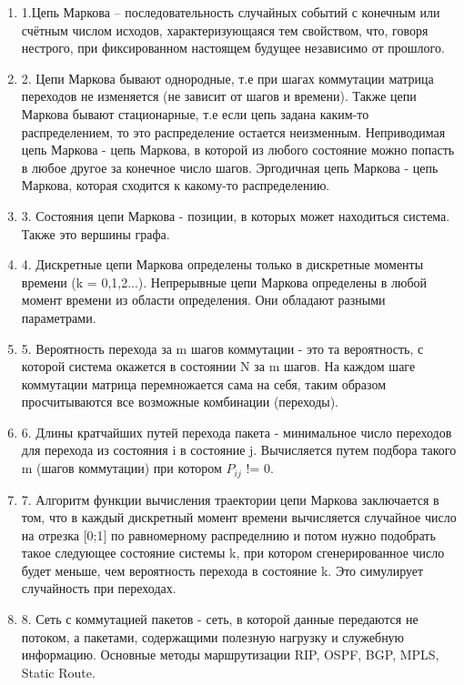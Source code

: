 \begin{enumerate}
    \item 1.Цепь Маркова – последовательность случайных событий с конечным или счётным числом исходов, характеризующаяся тем 
    свойством, что, говоря нестрого, при фиксированном настоящем будущее независимо от прошлого.
    \item 2. Цепи Маркова бывают однородные, т.е при шагах коммутации матрица переходов не изменяется (не зависит от шагов и времени).
    Также цепи Маркова бывают стационарные, т.е если цепь задана каким-то распределением, то это распределение остается неизменным.
    Неприводимая цепь Маркова - цепь Маркова, в которой из любого состояние можно попасть в любое другое за конечное число шагов.
    Эргодичная цепь Маркова - цепь Маркова, которая сходится к какому-то распределению.
    \item 3. Состояния цепи Маркова - позиции, в которых может находиться система. Также это вершины графа.
    \item 4. Дискретные цепи Маркова определены только в дискретные моменты времени (k = 0,1,2...). Непрерывные цепи Маркова
    определены в любой момент времени из области определения. Они обладают разными параметрами.
    \item 5. Вероятность перехода за m шагов коммутации - это та вероятность, с которой система окажется в состоянии N за m шагов.
    На каждом шаге коммутации матрица перемножается сама на себя, таким образом просчитываются все возможные комбинации (переходы).
    \item 6. Длины кратчайших путей перехода пакета - минимальное число переходов для перехода из состояния i в состояние j.
    Вычисляется путем подбора такого m (шагов коммутации) при котором  $P_{ij}$ != 0.
    \item 7. Алгоритм функции вычисления траектории цепи Маркова заключается в том, что в каждый дискретный момент времени вычисляется
    случайное число на отрезка [0;1] по равномерному распределнию и потом нужно подобрать такое следующее состояние системы k, при котором
    сгенерированное число будет меньше, чем вероятность перехода в состояние k. Это симулирует случайность при переходах.
    \item 8. Сеть с коммутацией пакетов - сеть, в которой данные передаются не потоком, а пакетами, содержащими полезную нагрузку
    и служебную информацию. Основные методы маршрутизации RIP, OSPF, BGP, MPLS, Static Route. 

\end{enumerate}

\endinput
